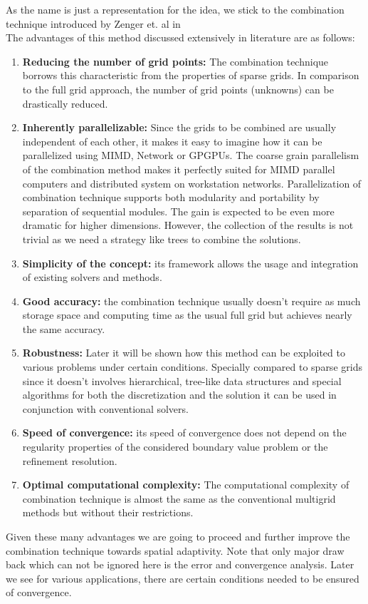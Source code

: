 As the name is just a representation for the idea, we stick to the combination technique introduced by Zenger et. al in  \cite{Griebel1992b}\\
The advantages of this method discussed extensively in literature are as follows:

\begin{enumerate}
	\item \textbf{Reducing the number of grid points:} The combination technique borrows this characteristic from the properties of sparse grids. In comparison to the full grid approach, the number of grid points (unknowns) can be drastically reduced.
	\item \textbf{Inherently parallelizable:} Since the grids to be combined are usually independent of each other, it makes it easy to imagine how it can be parallelized using MIMD\cite{Griebel1992a}, Network\cite{Griebel1992} or GPGPUs\cite{Gaikwad2009}. The coarse grain parallelism of the combination method makes it perfectly suited for MIMD parallel computers and distributed system on workstation networks. Parallelization of combination technique supports both modularity and portability by separation of sequential modules. The gain is expected to be even more dramatic for higher dimensions. However, the collection of the results is not trivial as we need a strategy like trees to combine the solutions.
	\item \textbf{Simplicity of the concept:} its framework allows the usage and integration of existing solvers and methods\cite{Bungartz1994}.
	\item \textbf{Good accuracy:} the combination technique usually doesn't require as much storage space and computing time as the usual full grid but achieves nearly the same accuracy\cite{Griebel1995}.
    \item \textbf{Robustness:} Later it will be shown how this method can be exploited to various problems under certain conditions. Specially compared to sparse grids since it doesn't involves hierarchical, tree-like data structures and special algorithms for both the discretization and the solution it can be used in conjunction with conventional solvers.
    \item \textbf{Speed of convergence:} its speed of convergence does not depend on the regularity properties of the considered boundary value problem or the refinement resolution\cite{Yserentant1986}.
    \item \textbf{Optimal computational complexity:} The computational complexity of combination technique is almost the same as the conventional multigrid methods but without their restrictions\cite{Yserentant1986}.
\end{enumerate}

Given these many advantages we are going to proceed and further improve the combination technique towards spatial adaptivity. Note that only major draw back which can not be ignored here is the error and convergence analysis. Later we see for various applications, there are certain conditions needed to be ensured of convergence.
